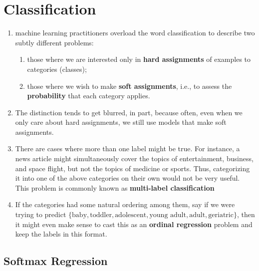 \chapter{Classification} \label{Classification}


\begin{enumerate}
    \item machine learning practitioners overload the word classification to describe two subtly different problems: \cite{d2l}

    \begin{enumerate}
        \item those where we are interested only in \textbf{hard assignments} of examples to categories (classes);
        
        \item those where we wish to make \textbf{soft assignments}, i.e., to assess the \textbf{probability} that each category applies. 

    \end{enumerate}

    \item The distinction tends to get blurred, in part, because often, even when we only care about hard assignments, we still use models that make soft assignments. \cite{d2l}

    \item There are cases where more than one label might be true. For instance, a news article might simultaneously cover the topics of entertainment, business, and space flight, but not the topics of medicine or sports. Thus, categorizing it into one of the above categories on their own would not be very useful. This problem is commonly known as \textbf{multi-label classification} \cite{d2l}

    \item If the categories had some natural ordering among them, say if we were trying to predict $\{\textrm{baby}, \textrm{toddler}, \textrm{adolescent}, \textrm{young adult}, \textrm{adult}, \textrm{geriatric}\}$, then it might even make sense to cast this as an \textbf{ordinal regression} problem and keep the labels in this format.
\end{enumerate}


\section{Softmax Regression \cite{dnn-1}} \label{classification: Softmax Regression}

